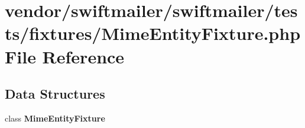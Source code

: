 \section{vendor/swiftmailer/swiftmailer/tests/fixtures/\+Mime\+Entity\+Fixture.php File Reference}
\label{_mime_entity_fixture_8php}
\subsection*{Data Structures}
\begin{DoxyCompactItemize}
\item 
class {\bf Mime\+Entity\+Fixture}
\end{DoxyCompactItemize}
